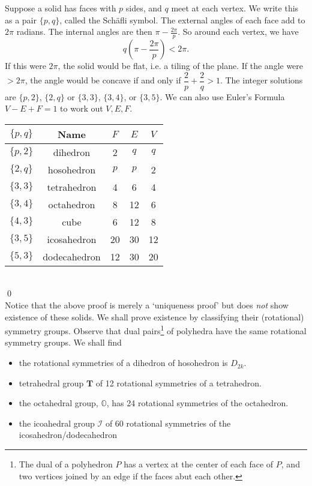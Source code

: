 \pf Suppose a solid has faces with $p$ sides, and $q$ meet at each vertex. We write this as a pair $\{p,q\}$, called the Sch\"afli symbol. The external angles of each face add to $2\pi$ radians. The internal angles are then $\pi - \frac{2\pi}{p}$. So around each vertex, we have
	\[
	q \left( \pi - \dfrac{2\pi}{p}\right)< 2\pi.
	\]
If this were $2\pi$, the solid would be flat, i.e. a tiling of the plane. If the angle were $>2\pi$, the angle would be concave if and only if $\dfrac{2}{p} + \dfrac{2}{q}>1$. The integer solutions are $\{p,2\}$, $\{2,q\}$ or $\{3,3\}$, $\{3,4\}$, or $\{3,5\}$. We can also use Euler's Formula $V-E+F=1$ to work out $V,E, F$. 
	\begin{table}[h]
	\centering
	\begin{tabular}{ccccc}
	$\{p,q\}$ & Name & $F$ & $E$ & $V$ \\ \hline
	$\{p,2\}$ & dihedron & 2 & $q$ & $q$ \\
	$\{2,q\}$ & hosohedron & $p$ & $p$ & 2 \\
	$\{3,3\}$ & tetrahedron & 4 & 6 & 4 \\
	$\{3,4\}$ & octahedron & 8 & 12 & 6 \\
	$\{4,3\}$ & cube & 6 & 12 & 8 \\
	$\{3,5\}$ & icosahedron & 20 & 30 & 12 \\
	$\{5,3\}$ & dodecahedron & 12 & 30 & 20
	\end{tabular}
	\end{table} \\
\qed \\


Notice that the above proof is merely a `uniqueness proof' but does \emph{not} show existence of these solids. We shall prove existence by classifying their (rotational) symmetry groups. Observe that dual pairs\footnote{The dual of a polyhedron $P$ has a vertex at the center of each face of $P$, and two vertices joined by an edge if the faces abut each other.} of polyhedra have the same rotational symmetry groups. We shall find
	\begin{itemize}
	\item the rotational symmetries of a dihedron of hosohedron is $D_{2k}$.	
	\item tetrahedral group $\mathbf{T}$ of 12 rotational symmetries of a tetrahedron. 
	\item the octahedral group, $\mathbb{O}$, has 24 rotational symmetries of the octahedron.
	\item the icoahedral group $\mathcal{I}$ of 60 rotational symmetries of the icosahedron/dodecahedron
	\end{itemize}


